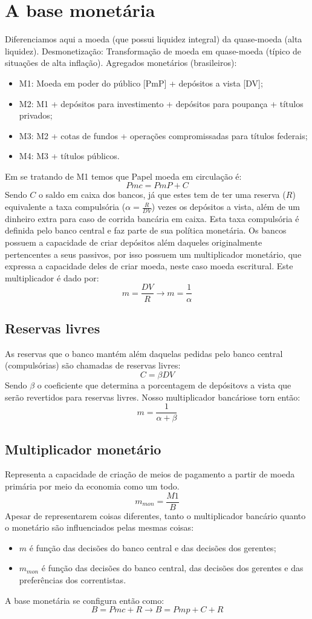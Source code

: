 \documentclass[12pt,a4paper,oneside,brazil]{abntex2}
\begin{document}
\section{A base monetária}
Diferenciamos aqui a moeda (que possui liquidez integral) da quase-moeda (alta liquidez). \newline
Desmonetização: Transformação de moeda em quase-moeda (típico de situações de alta inflação). \newline
Agregados monetários (brasileiros):
\begin{itemize}
\item M1: Moeda em poder do público [PmP] + depósitos a vista [DV];
\item M2: M1 + depósitos para investimento + depósitos para poupança + títulos privados;
\item M3: M2 + cotas de fundos + operações compromissadas para títulos federais;
\item M4: M3 + títulos públicos.
\end{itemize}
Em se tratando de M1 temos que Papel moeda em circulação é:
\[ Pmc = PmP + C\]
Sendo $C$ o saldo em caixa dos bancos, já que estes tem de ter uma reserva ($R$) equivalente a taxa compulsória ($\alpha = \frac{R}{DV}$) vezes os depósitos a vista, além de um dinheiro extra  para caso de corrida bancária em caixa. Esta taxa compulsória é definida pelo banco central e faz parte de sua política monetária. Os bancos possuem a capacidade de criar depósitos além daqueles originalmente pertencentes a seus passivos, por isso possuem um multiplicador monetário, que expressa a capacidade deles de criar moeda, neste caso moeda escritural. Este multiplicador é dado por:
\[  m = \frac{DV}{R} \rightarrow m = \frac{1}{\alpha} \]

\subsection{Reservas livres}
As reservas que o banco mantém além daquelas pedidas pelo banco central (compulsórias) são chamadas de reservas livres:
\[ C = \beta DV \]
Sendo $\beta$ o coeficiente que determina a porcentagem de depósitovs a vista que serão revertidos para reservas livres. Nosso multiplicador bancáriose torn então:
\[  m = \frac{1}{\alpha + \beta} \]

\subsection{Multiplicador monetário}
Representa a capacidade de criação de meios de pagamento a partir de moeda primária por meio da economia como um todo.
\[ m_{mon} = \frac{M1}{B} \]
Apesar de representarem coisas diferentes, tanto o multiplicador bancário quanto o monetário são influenciados pelas mesmas coisas:
\begin{itemize}
\item $m$ é função das decisões do banco central e das decisões dos gerentes;
\item $m_{mon}$ é função das decisões do banco central, das decisões dos gerentes e das preferências dos correntistas.
\end{itemize}
A base monetária se configura então como:
\[ B = Pmc + R \rightarrow B = Pmp + C + R \]
\end{document}
